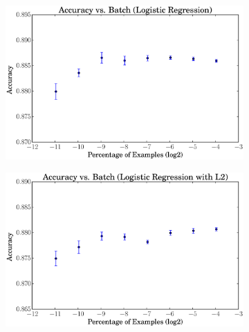 \documentclass[a4paper, 12pt]{article}
\begin{document}
\begin{figure}[htpb]
\begin{subfigure}[htpb]{0.45\textwidth}
        \includegraphics[width=\textwidth]{acc_vs_batchp_logreg}
        \caption{}
        \label{fig:gwd}
    \end{subfigure}
    \begin{subfigure}[htpb]{0.45\textwidth}
        \includegraphics[width=\textwidth]{acc_vs_batchp_logregL2}
        \caption{}
        \label{fig:bwd}
    \end{subfigure}
    \caption{}\label{fig:viz}
\end{figure}
\end{document}
